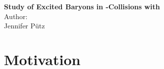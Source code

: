 \documentclass[a4paper, 11pt, twoside]{scrreprt}
\begin{document}
	\pagestyle{fancy}
	\begin{titlepage}
		\thispagestyle{empty}
		\begin{center}
			\textbf{\Huge{Study of Excited \cascade Baryons in \pbarpSystem-Collisions with \panda}}\vspace{1cm}\\
			\Large{Author:}\vspace{0.3cm}\\
			\LARGE{Jennifer 
			      P\"{u}tz\vspace{2cm}}
		\end{center}\vspace{1cm}

	\end{titlepage}
	\thispagestyle{empty}
	\cleardoublepage
	
	\tableofcontents
	\newpage
	\setcounter{page}{1}

	\chapter{Motivation}
	
\end{document}
